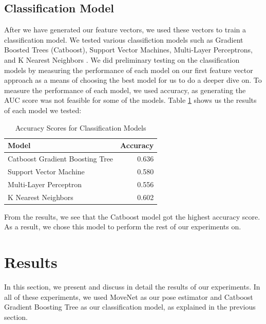 \documentclass[10pt,twocolumn,letterpaper]{article}
\begin{document}
\subsection{Classification Model}
After we have generated our feature vectors, we used these vectors to train a classification model. We tested various classifiction models such as
Gradient Boosted Trees (Catboost), Support Vector Machines, Multi-Layer Perceptrons, and K Nearest Neighbors \cite{catboost}\cite{inproceedings}\cite{MURTAGH1991183}. We
did preliminary testing on the classification models by measuring the performance of each model on our first feature vector approach as a means of 
choosing the best model for us to do a deeper dive on. To measure the performance of each model, we used accuracy, as generating the AUC score was not 
feasible for some of the models. Table \ref{tab:table1} shows us the results of each model we tested:
\begin{table}[h]
  \begin{center}
    \caption{Accuracy Scores for Classification Models}
    \label{tab:table1}
    \begin{tabular}{l | r}
      \textbf{Model} & \textbf{Accuracy} \\
      \hline
      Catboost Gradient Boosting Tree & 0.636 \\
      Support Vector Machine & 0.580 \\
      Multi-Layer Perceptron & 0.556 \\
      K Nearest Neighbors & 0.602 \\
    \end{tabular}
  \end{center}
\end{table}

From the results, we see that the Catboost model got the highest accuracy score. As a result, we chose this model to perform the rest of our experiments on.

\section{Results}
In this section, we present and discuss in detail the results of our experiments. In all of these experiments, we used MoveNet as our pose estimator and Catboost
Gradient Boosting Tree as our classification model, as explained in the previous section.
\end{document}
